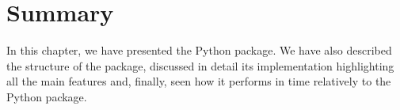\section{Summary}
In this chapter, we have presented the \LTLfToDFA Python package. We have also described the structure of the package, discussed in detail its implementation highlighting all the main features and, finally, seen how it performs in time relatively to the \FLLOAT Python package.


















